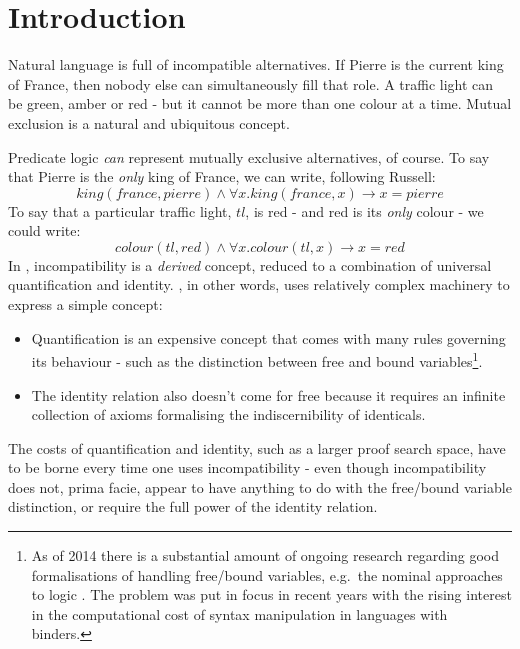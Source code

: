 \section{Introduction}\label{introduction}

Natural language is full of incompatible alternatives.
If Pierre is the current king of France, then nobody else can simultaneously fill that role.
A traffic light can be green, amber or red - but it cannot be more than one colour at a time.
Mutual exclusion is a natural and ubiquitous concept.

Predicate logic \emph{can} represent mutually exclusive alternatives, of course.
To say that Pierre is the \emph{only} king of France, we can write, following Russell:
\[
king(france, pierre) \land \forall x . king(france, x) \rightarrow x = pierre
\]
To say that a particular traffic light, $tl$, is red - and red is its \emph{only} colour - we could write:
\[
colour(tl, red) \land \forall x . colour(tl, x) \rightarrow x = red
\]
In \fol{}, incompatibility is a \emph{derived} concept, reduced to 
a combination of universal quantification and identity.  \FOL{}, in other words, uses relatively complex machinery to express a
simple concept:
\begin{itemize}

\item Quantification is an expensive concept that comes with many
  rules governing its behaviour - such as the distinction between free
  and bound variables\footnote{As of 2014 there is a substantial
    amount of ongoing research regarding good formalisations of
    handling free/bound variables, e.g.~the nominal approaches to
    logic \cite{PittsAM:nomsetnasics}. The problem was
    put in focus in recent years with the rising interest in the
    computational cost of syntax manipulation in languages with
    binders.}.

\item The identity relation also doesn't come for free because it
  requires an infinite collection of axioms formalising the
  indiscernibility of identicals.

\end{itemize}

\NI The costs of quantification and identity, such as a larger proof
search space, have to be borne every time one uses incompatibility - even
though incompatibility does not, prima facie, appear to have anything to do
with the free/bound variable distinction, or require the full power of 
the identity relation.

